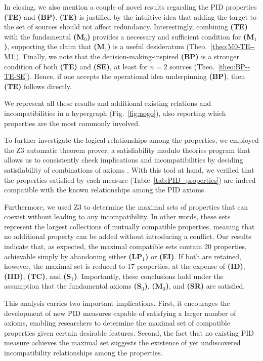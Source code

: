 \documentclass{article}
\newcommand{\ts}[1]{\ensuremath{_{\text{#1}}}}
\newcommand{\SR}{\textbf{(SR)}\xspace} %
\newcommand{\Sz}{\textbf{(S\ts{0})}\xspace} %
\newcommand{\Mz}{\textbf{(M\ts{0})}\xspace} %
\newcommand{\ID}{\textbf{(ID)}\xspace} %
\newcommand{\IID}{\textbf{(IID)}\xspace} %
\newcommand{\TC}{\textbf{(TC)}\xspace} %
\newcommand{\So}{\textbf{(S\ts{1})}\xspace} %
\newcommand{\Mo}{\textbf{(M\ts{1})}\xspace} %
\newcommand{\LPo}{\textbf{(LP\ts{1})}\xspace} %
\newcommand{\BP}{\textbf{(BP)}\xspace} %
\newcommand{\TE}{\textbf{(TE)}\xspace} %
\newcommand{\EI}{\textbf{(EI)}\xspace} %
\newcommand{\SE}{\textbf{(SE)}\xspace} %
\begin{document}
In closing, we also mention a couple of novel results regarding the PID properties \TE and \BP. 
\TE is justified by the intuitive idea that adding the target to the set of sources should not affect redundancy. Interestingly, combining \TE with the fundamental \Mz provides a necessary and sufficient condition for \Mo, supporting the claim that \Mo is a useful desideratum \cite{griffith2014intersection} (Theo.~\ref{theo:M0-TE--M1}). 
Finally, we note that the decision-making-inspired \BP is a stronger condition of both \TE and \SE, at least for $n=2$ sources (Theo.~\ref{theo:BP--TE-SE}). Hence, if one accepts the operational idea underpinning \BP, then \TE follows directly.

We represent all these results and additional existing relations and incompatibilities in a hypergraph (Fig.~\ref{fig:nogo}), also reporting which properties are the most commonly involved.

To further investigate the logical relationships among the properties, we employed the Z3 automatic theorem prover, a satisfiability modulo theories program that allows us to consistently check implications and incompatibilities by deciding satisfiability of combinations of axioms \cite{de2008z3}. 
With this tool at hand, we verified that the properties satisfied by each measure (Table~\ref{tab:PID_properties}) are indeed compatible with the known relationships among the PID axioms.

Furthermore, we used Z3 to determine the maximal sets of properties that can coexist without leading to any incompatibility. In other words, these sets represent the largest collections of mutually compatible properties, meaning that no additional property can be added without introducing a conflict.
Our results indicate that, as expected, the maximal compatible sets contain 20 properties, achievable simply by abandoning either \LPo or \EI. If both are retained, however, the maximal set is reduced to 17 properties, at the expense of \ID, \IID, \TC, and \So. Importantly, these conclusions hold under the assumption that the fundamental axioms \Sz, \Mz, and \SR are satisfied.

This analysis carries two important implications. First, it encourages the development of new PID measures capable of satisfying a larger number of axioms, enabling researchers to determine the maximal set of compatible properties given certain desirable features. Second, the fact that no existing PID measure achieves the maximal set suggests the existence of yet undiscovered incompatibility relationships among the properties. 
\end{document}
